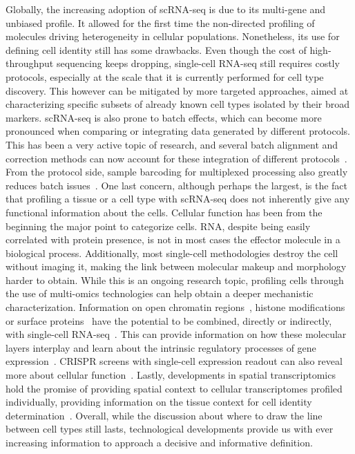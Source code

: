 Globally, the increasing adoption of scRNA-seq is due to its multi-gene and unbiased profile. It allowed for the first time the non-directed profiling of molecules driving heterogeneity in cellular populations. Nonetheless, its use for defining cell identity still has some drawbacks. Even though the cost of high-throughput sequencing keeps dropping, single-cell RNA-seq still requires costly protocols, especially at the scale that it is currently performed for cell type discovery. This however can be mitigated by more targeted approaches, aimed at characterizing specific subsets of already known cell types isolated by their broad markers. scRNA-seq is also prone to batch effects, which can become more pronounced when comparing or integrating data generated by different protocols. This has been a very active topic of research, and several batch alignment and correction methods can now account for these integration of different protocols~\citep{butler_integrating_2018,haghverdi_batch_2018,park_fast_2018,stuart_comprehensive_2019}. From the protocol side, sample barcoding for multiplexed processing also greatly reduces batch issues~\citep{stoeckius_cell_2018,shin_multiplexed_2019}. One last concern, although perhaps the largest, is the fact that profiling a tissue or a cell type with scRNA-seq does not inherently give any functional information about the cells. Cellular function has been from the beginning the major point to categorize cells. RNA, despite being easily correlated with protein presence, is not in most cases the effector molecule in a biological process. Additionally, most single-cell methodologies destroy the cell without imaging it, making the link between molecular makeup and morphology harder to obtain. While this is an ongoing research topic, profiling cells through the use of multi-omics technologies can help obtain a deeper mechanistic characterization. Information on open chromatin regions~\citep{buenrostro_single-cell_2015}, histone modifications~\citep{kaya-okur_cut&tag_2019} or surface proteins~\citep{stoeckius_simultaneous_2017} have the potential to be combined, directly or indirectly, with single-cell RNA-seq~\citep{clark_scnmt-seq_2018}. This can provide information on how these molecular layers interplay and learn about the intrinsic regulatory processes of gene expression~\citep{gorin_rna_2019,qiu_mapping_2019}. CRISPR screens with single-cell expression readout can also reveal more about cellular function~\citep{dixit_perturb-seq:_2016,datlinger_pooled_2017}. Lastly, developments in spatial transcriptomics hold the promise of providing spatial context to cellular transcriptomes profiled individually, providing information on the tissue context for cell identity determination~\citep{vickovic_high-density_2019,rodriques_slide-seq:_2019}. Overall, while the discussion about where to draw the line between cell types still lasts, technological developments provide us with ever increasing information to approach a decisive and informative definition.



